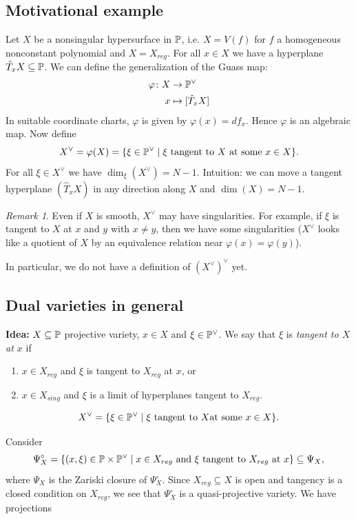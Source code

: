 \documentclass[A4paper, british, reqno]{amsart}
\theoremstyle{darkgreentheorem}
\theoremstyle{darkbluedefinition}
\theoremstyle{darkredexample}
\theoremstyle{remark}
\newtheorem{rem}[thm]{Remark}
\newcommand{\1}{\mathbbm{1}}
\newcommand{\dual}{^{\vee}}
\newcommand{\tms}{\times}
\newcommand{\sub}{\subseteq}
\begin{document}
\subsection{Motivational example}
Let $X$ be a nonsingular hypersurface in $\P$, i.e. $X=V(f)$ for $f$ a homogeneous nonconstant polynomial and $X=X_{reg}$.
For all $x\in X$ we have a hyperplane $\hat{T}_{x}X\sub \P$.
We can define the generalization of the Guass map:
\begin{align*}
    \varphi\colon X & \to \P\dual \\
    x & \mapsto [\hat{T}_{x}X]
\end{align*}
In suitable coordinate charts, $\varphi$ is given by $\varphi(x)=df_{x}$.
Hence $\varphi$ is an algebraic map.
Now define
\[ X\dual=\varphi(X)=\{\xi\in \P\dual \mid \xi \text{ tangent to }X\text{ at some }x\in X\}. \]
For all $\xi\in X\dual$ we have $\dim_{\xi}(X\dual)=N-1$.
Intuition: we can move a tangent hyperplane $(\hat{T}_{x}X)$ in any direction along $X$ and $\dim(X)=N-1$.

\begin{rem}
    Even if $X$ is smooth, $X\dual$ may have singularities.
    For example, if $\xi$ is tangent to $X$ at $x$ and $y$ with $x\neq y$, then we have some singularities ($X\dual$ looks like a quotient of $X$ by an equivalence relation near $\varphi(x)=\varphi(y)$).

    In particular, we do not have a definition of $(X\dual)\dual$ yet.
\end{rem}

\subsection{Dual varieties in general}

\textbf{Idea:} $X\sub \P$ projective variety, $x\in X$ and $\xi\in \P\dual$.
We say that $\xi$ is \textit{tangent to $X$ at $x$} if
\begin{enumerate}
    \item $x\in X_{reg}$ and $\xi$ is tangent to $X_{reg}$ at $x$, or
    \item $x\in X_{sing}$ and $\xi$ is a limit of hyperplanes tangent to $X_{reg}$.
\end{enumerate}
\[ X\dual=\{\xi\in \P\dual \mid \xi \text{ tangent to }X\text{at some }x\in X\}. \]

Consider
\[ \Psi_{X}^{\circ}=\{(x,\xi)\in \P\tms \P\dual \mid x\in X_{reg} \text{ and }\xi\text{ tangent to }X_{reg} \text{ at } x\} \sub \Psi_{X}, \]
where $\Psi_{X}$ is the Zariski closure of $\Psi_{X}^{\circ}$.
Since $X_{reg}\sub X$ is open and tangency is a closed condition on $X_{reg}$, we see that $\Psi_{X}^{\circ}$ is a quasi-projective variety.
We have projections
\begin{center}
\end{center}
\end{document}
